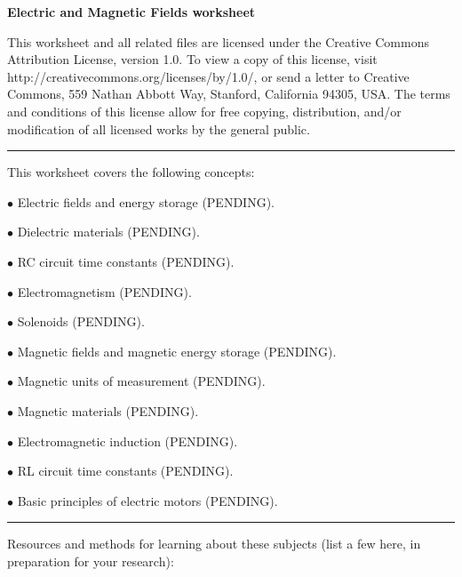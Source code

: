 
\centerline{\bf Electric and Magnetic Fields worksheet} \bigskip 
 
This worksheet and all related files are licensed under the Creative Commons Attribution License, version 1.0.  To view a copy of this license, visit http://creativecommons.org/licenses/by/1.0/, or send a letter to Creative Commons, 559 Nathan Abbott Way, Stanford, California 94305, USA.  The terms and conditions of this license allow for free copying, distribution, and/or modification of all licensed works by the general public.

\bigskip 

\hrule

\vskip 5pt

This worksheet covers the following concepts:

\bigskip

\item {$\bullet$} Electric fields and energy storage (PENDING).
\item {$\bullet$} Dielectric materials (PENDING).
\item {$\bullet$} RC circuit time constants (PENDING).
\item {$\bullet$} Electromagnetism (PENDING).
\item {$\bullet$} Solenoids (PENDING).
\item {$\bullet$} Magnetic fields and magnetic energy storage (PENDING).
\item {$\bullet$} Magnetic units of measurement (PENDING).
\item {$\bullet$} Magnetic materials (PENDING).
\item {$\bullet$} Electromagnetic induction (PENDING).
\item {$\bullet$} RL circuit time constants (PENDING).
\item {$\bullet$} Basic principles of electric motors (PENDING).

\bigskip 

\hrule

\vskip 10pt

Resources and methods for learning about these subjects (list a few here, in preparation for your research):


